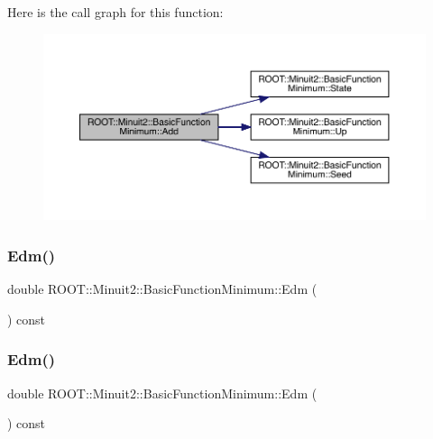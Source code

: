 Here is the call graph for this function\+:
\nopagebreak
\begin{figure}[H]
\begin{center}
\leavevmode
\includegraphics[width=350pt]{de/d25/classROOT_1_1Minuit2_1_1BasicFunctionMinimum_abd32f932e7a26883723b33c4a1402a85_cgraph}
\end{center}
\end{figure}
\mbox{\label{classROOT_1_1Minuit2_1_1BasicFunctionMinimum_abecb5c249e988f6f3f792e2bcc11d4a4}} 
\subsubsection{\texorpdfstring{Edm()}{Edm()}\hspace{0.1cm}{\footnotesize\ttfamily [1/2]}}
{\footnotesize\ttfamily double R\+O\+O\+T\+::\+Minuit2\+::\+Basic\+Function\+Minimum\+::\+Edm (\begin{DoxyParamCaption}{ }\end{DoxyParamCaption}) const\hspace{0.3cm}{\ttfamily [inline]}}

\mbox{\label{classROOT_1_1Minuit2_1_1BasicFunctionMinimum_abecb5c249e988f6f3f792e2bcc11d4a4}} 
\subsubsection{\texorpdfstring{Edm()}{Edm()}\hspace{0.1cm}{\footnotesize\ttfamily [2/2]}}
{\footnotesize\ttfamily double R\+O\+O\+T\+::\+Minuit2\+::\+Basic\+Function\+Minimum\+::\+Edm (\begin{DoxyParamCaption}{ }\end{DoxyParamCaption}) const\hspace{0.3cm}{\ttfamily [inline]}}

